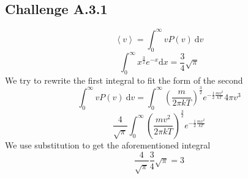 \documentclass[reprint,english,notitlepage]{revtex4-2}
\begin{document}
	\subsection*{Challenge A.3.1}
	\[
	\left< v \right> = ∫  _{0}^{\infty} vP(v) \ \mathrm{d}v
	\]
	\[
	\int_{0}^{\infty} x^{\frac{3}{2}} e^{-x} \mathrm{d}x = \frac{3}{4} \sqrt{\pi}  
	\]
	We try to rewrite the first integral to fit the form of the second 
	\[
	\int _{0}^{\infty} vP(v) \ \mathrm{d}v = \int _{0}^{\infty} \left( \frac{m}{2 \pi k T} \right) ^{\frac{3}{2}} e ^{-\frac{1}{2} \frac{mv^{2}}{k T}} 4 \pi v^{3}
	\]\newline 
	\[
	\frac{4}{\sqrt{\pi}} \int _{0}^{\infty} \left( \frac{mv^{2}}{2 \pi k T} \right) ^{\frac{3}{2}} e ^{-\frac{1}{2} \frac{mv^{2}}{k T}} 
	\]
	We use substitution to get the aforementioned integral
	\[
	\frac{4}{\sqrt{\pi}} \frac{3}{4} \sqrt{\pi} = 3
	\]
\end{document}
